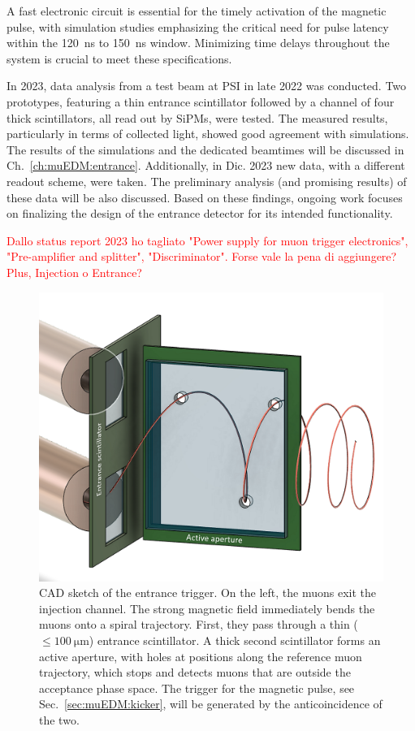 \begin{refsection}
        A fast electronic circuit is essential for the timely activation of the magnetic pulse, with simulation studies emphasizing the critical need for pulse latency within the \SI{120}{ns} to \SI{150}{ns} window. 
        Minimizing time delays throughout the system is crucial to meet these specifications.
        
        In 2023, data analysis from a test beam at PSI in late 2022 was conducted. 
        Two prototypes, featuring a thin entrance scintillator followed by a channel of four thick scintillators, all read out by SiPMs, were tested. 
        The measured results, particularly in terms of collected light, showed good agreement with simulations.
        The results of the simulations and the dedicated beamtimes will be discussed in Ch.~\ref{ch:muEDM:entrance}.
        Additionally, in Dic. 2023 new data, with a different readout scheme, were taken. 
        The preliminary analysis (and promising results) of these data will be also discussed.
        Based on these findings, ongoing work focuses on finalizing the design of the entrance detector for its intended functionality.

        \textcolor{red}{Dallo status report 2023 ho tagliato "Power supply for muon trigger electronics", "Pre-amplifier and splitter", "Discriminator". Forse vale la pena di aggiungere? Plus, Injection o Entrance?}

        \begin{figure}
        \centering
            \includegraphics[width=0.35\linewidth]{Figures/muEDM/MuonEntranceTriggerCAD.png}
            \caption{CAD sketch of the entrance trigger. On the left, the muons exit the injection channel. The strong magnetic field immediately bends the muons onto a spiral trajectory. First, they pass through a thin ($\leq\SI{100}{\micro\meter}$) entrance scintillator. A thick second scintillator forms an active aperture, with holes at positions along the reference muon trajectory, which stops and detects muons that are outside the acceptance phase space. The trigger for the magnetic pulse, see Sec.~\ref{sec:muEDM:kicker}, will be generated by the anticoincidence of the two.}
        \label{fig:MuonEntranceTriggerCAD}
        \end{figure}


\end{refsection}
